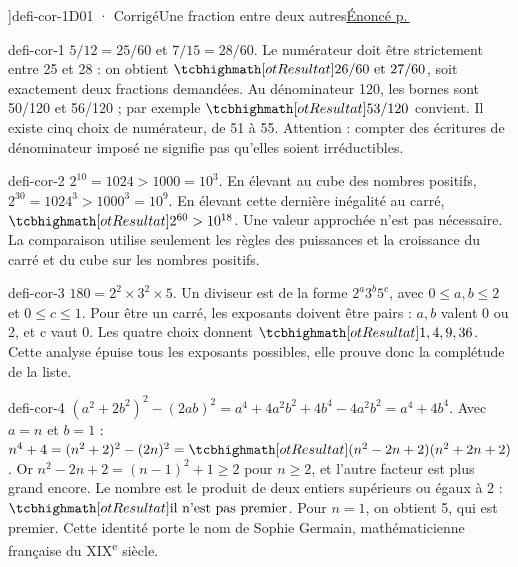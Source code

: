\editionPage[\pdfbookmark[0]{Corrigés des défis}{bm-defi-cor-1-parent}]{defi-cor-1}{D01 · Corrigé}{Une fraction entre deux autres}{\hyperref[defi-ex-1]{Énoncé p.\,\pageref*{defi-ex-1}}}
\begin{blocEdition}{defi-cor-1}
$5/12=25/60$ et $7/15=28/60$. Le numérateur doit être strictement entre 25 et 28 : on obtient $\res{26/60\text{ et }27/60}$, soit exactement deux fractions demandées. Au dénominateur 120, les bornes sont 50/120 et 56/120 ; par exemple $\res{53/120}$ convient. Il existe cinq choix de numérateur, de 51 à 55. Attention : compter des écritures de dénominateur imposé ne signifie pas qu’elles soient irréductibles.
\end{blocEdition}
\begin{blocEdition}{defi-cor-2}
$2^{10}=1024>1000=10^3$. En élevant au cube des nombres positifs, $2^{30}=1024^3>1000^3=10^9$. En élevant cette dernière inégalité au carré, $\res{2^{60}>10^{18}}$. Une valeur approchée n’est pas nécessaire. La comparaison utilise seulement les règles des puissances et la croissance du carré et du cube sur les nombres positifs.
\end{blocEdition}
\begin{blocEdition}{defi-cor-3}
$180=2^2\times3^2\times5$. Un diviseur est de la forme $2^a3^b5^c$, avec $0\le a,b\le2$ et $0\le c\le1$. Pour être un carré, les exposants doivent être pairs : $a,b$ valent 0 ou 2, et c vaut 0. Les quatre choix donnent $\res{1,4,9,36}$. Cette analyse épuise tous les exposants possibles, elle prouve donc la complétude de la liste.
\end{blocEdition}
\begin{blocEdition}{defi-cor-4}
$(a^2+2b^2)^2-(2ab)^2=a^4+4a^2b^2+4b^4-4a^2b^2=a^4+4b^4$. Avec $a=n$ et $b=1$ : $n^4+4=(n^2+2)^2-(2n)^2=\res{(n^2-2n+2)(n^2+2n+2)}$. Or $n^2-2n+2=(n-1)^2+1\ge2$ pour $n\ge2$, et l’autre facteur est plus grand encore. Le nombre est le produit de deux entiers supérieurs ou égaux à 2 : $\res{\text{il n’est pas premier}}$. Pour $n=1$, on obtient 5, qui est premier. Cette identité porte le nom de Sophie Germain, mathématicienne française du XIX\textsuperscript{e} siècle.
\end{blocEdition}
